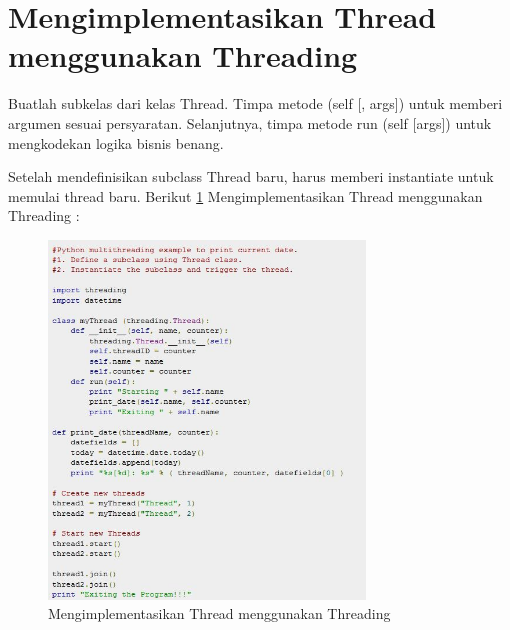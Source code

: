 \section{Mengimplementasikan Thread menggunakan Threading}
\hspace*{0.5in} Buatlah subkelas dari kelas Thread. Timpa metode (self [, args]) untuk memberi argumen sesuai persyaratan. Selanjutnya, timpa metode run (self [args]) untuk mengkodekan logika bisnis benang.

\hspace*{0.5in} Setelah mendefinisikan subclass Thread baru, harus memberi instantiate untuk memulai thread baru. Berikut \ref{Mengimplementasikan Thread menggunakan Threading} Mengimplementasikan Thread menggunakan Threading :
\begin{figure}[ht]
	\centerline{\includegraphics[width=0.75\textwidth]{figures/Thread}}
	\caption{Mengimplementasikan Thread menggunakan Threading}
	\label{Mengimplementasikan Thread menggunakan Threading}
\end{figure}

